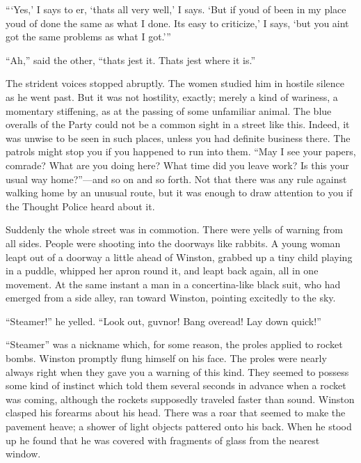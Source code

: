 ```Yes,' I says to \textquotesingle er, `that\textquotesingle s all very
well,' I says. `But if you\textquotesingle d of been in my place
you\textquotesingle d of done the same as what I done. It\textquotesingle s
easy to criticize,' I says, `but you ain\textquotesingle t got the same
problems as what I got.'{}''

``Ah,'' said the other, ``that\textquotesingle s jest it.
That\textquotesingle s jest where it is.''

The strident voices stopped abruptly. The women studied him in hostile
silence as he went past. But it was not hostility, exactly; merely a
kind of wariness, a momentary stiffening, as at the passing of some
unfamiliar animal. The blue overalls of the Party could not be a common
sight in a street like this. Indeed, it was unwise to be seen in such
places, unless you had definite business there. The patrols might stop
you if you happened to run into them. ``May I see your papers, comrade?
What are you doing here? What time did you leave work? Is this your
usual way home?''---and so on and so forth. Not that there was any rule
against walking home by an unusual route, but it was enough to draw
attention to you if the Thought Police heard about it.

Suddenly the whole street was in commotion. There were yells of warning
from all sides. People were shooting into the doorways like rabbits. A
young woman leapt out of a doorway a little ahead of Winston, grabbed up
a tiny child playing in a puddle, whipped her apron round it, and leapt
back again, all in one movement. At the same instant a man in a
concertina-like black suit, who had emerged from a side alley, ran
toward Winston, pointing excitedly to the sky.

``Steamer!'' he yelled. ``Look out, guv\textquotesingle nor! Bang
over\textquotesingle ead! Lay down quick!''

``Steamer'' was a nickname which, for some reason, the proles applied to
rocket bombs. Winston promptly flung himself on his face. The proles
were nearly always right when they gave you a warning of this kind. They
seemed to possess some kind of instinct which told them several seconds
in advance when a rocket was coming, although the rockets supposedly
traveled faster than sound. Winston clasped his forearms about his head.
There was a roar that seemed to make the pavement heave; a shower of
light objects pattered onto his back. When he stood up he found that he
was covered with fragments of glass from the nearest window.

